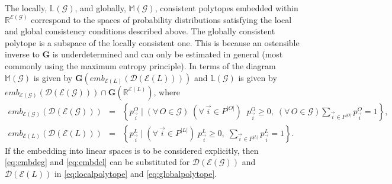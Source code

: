 \documentclass[10pt]{article}
\def\expr{\mathcal{E}}
\def\dist{\mathcal{D}}
\begin{document}
The locally, $\mathbb{L}(\mathcal{G})$, and globally, $\mathbb{M}(\mathcal{G})$, consistent polytopes embedded within $\mathbb{R}^{\mathcal{E}(\mathcal{G})}$ correspond to the spaces of probability distributions satisfying the local and global consistency conditions described above. The globally consistent polytope is a subspace of the locally consistent one. This is because an ostensible inverse to $\mathbf{G}$ is underdetermined and can only be estimated in general (most commonly using the maximum entropy principle). In terms of the diagram $\mathbb{M}(\mathcal{G})$ is given by $\mathbf{G}(emb_{\mathcal{E}(L)}(\mathcal{D}(\mathcal{E}(L))))$ and $\mathbb{L}(\mathcal{G})$ is given by $emb_{\mathcal{E}(\mathcal{G})}(\mathcal{D}(\mathcal{E}(\mathcal{G}))) \cap \mathbf{G}(\mathbb{R}^{\mathcal{E}(L)})$, where
\begin{eqnarray}
emb_{\mathcal{E}(\mathcal{G})}(\mathcal{D}(\mathcal{E}(\mathcal{G}))) &=& \left\{ p^{O}_{\vec{i}} \; \bigg| \; (\forall\, O \in \mathcal{G}) \; (\forall\, \vec{i} \in P^{|O|}) \;\; p^O_{\vec{i}} \geq 0, \; (\forall\, O \in \mathcal{G}) \sum_{\vec{i} \in P^{|O|}} p^{O}_{\vec{i}} = 1 \right\}, \label{eq:embdeg}\\
emb_{\mathcal{E}(L)}(\mathcal{D}(\mathcal{E}(L))) &=& \left\{ p^L_{\vec{i}} \; \bigg| \; (\forall\, \vec{i} \in P^{|L|}) \; p^L_{\vec{i}} \geq 0, \; \sum_{\vec{i} \in P^{|L|}} p^L_{\vec{i}} = 1 \right\}. \label{eq:embdel}
\end{eqnarray}
If the embedding into linear spaces is to be considered explicitly, then \ref{eq:embdeg} and \ref{eq:embdel} can be substituted for $\dist{}(\expr{}(\mathcal{G}))$ and $\dist{}(\expr{}(L))$ in \ref{eq:localpolytope} and \ref{eq:globalpolytope}.
\end{document}
